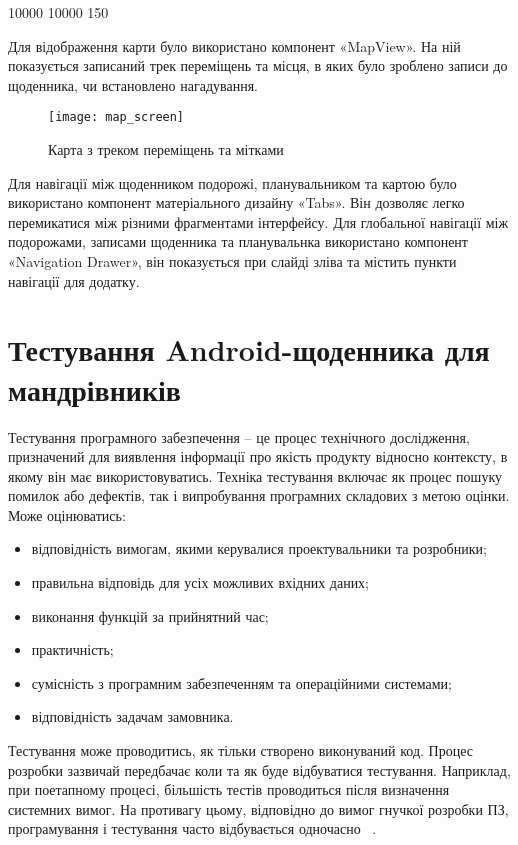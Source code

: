 \documentclass[../main.tex]{subfiles}
\begin{document}
{	
 10000 10000 150

Для відображення карти було використано компонент «MapView». На ній показується записаний трек переміщень та місця, в яких було зроблено записи до щоденника, чи встановлено нагадування.

}

\begin{figure}[H]
	\centering
	\texttt{[image: map\_screen]}
	\caption{Карта з треком переміщень та мітками}
	\label{figure:map_screen}
\end{figure}

Для навігації між щоденником подорожі, планувальником та картою було використано компонент матеріального дизайну «Tabs». Він дозволяє легко перемикатися між різними фрагментами інтерфейсу. Для глобальної навігації між подорожами, записами щоденника та планувальнка використано компонент «Navigation Drawer», він показується при слайді зліва та містить пункти навігації для додатку. 

\section{Тестування Android-щоденника для мандрівників}

Тестування програмного забезпечення -- це процес технічного дослідження, призначений для виявлення інформації про якість продукту відносно контексту, в якому він має використовуватись. Техніка тестування включає як процес пошуку помилок або дефектів, так і випробування програмних складових з метою оцінки. Може оцінюватись:

\begin{itemize}[label={--}]
	\item відповідність вимогам, якими керувалися проектувальники та розробники;
	\item правильна відповідь для усіх можливих вхідних даних;
	\item виконання функцій за прийнятний час;
	\item практичність;
	\item сумісність з програмним забезпеченням та операційними системами;
	\item відповідність задачам замовника.
\end{itemize}

Тестування може проводитись, як тільки створено виконуваний код. Процес розробки зазвичай передбачає коли та як буде відбуватися тестування. Наприклад, при поетапному процесі, більшість тестів проводиться після визначення системних вимог. На противагу цьому, відповідно до вимог гнучкої розробки ПЗ, програмування і тестування часто відбувається одночасно~\cite{testing} .
\end{document}
